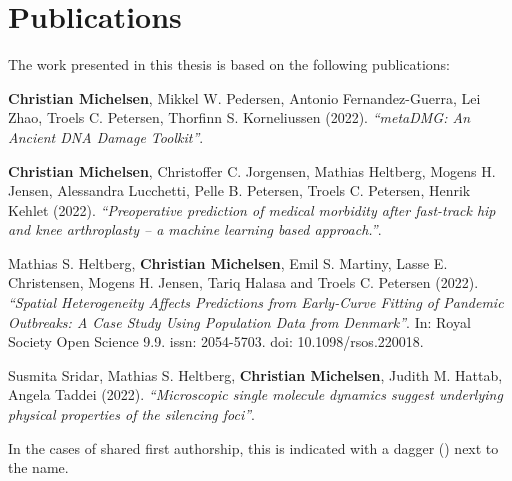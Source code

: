 \chapter{Publications}

The work presented in this thesis is based on the following publications:

\vspace{1.5cm}

\begin{description} [labelindent=1cm,style=multiline,leftmargin=3cm]
    \item [Paper 1:] \textbf{Christian Michelsen}\textsuperscript{\textdagger}, Mikkel W. Pedersen\textsuperscript{\textdagger}, Antonio Fernandez-Guerra, Lei Zhao, Troels C. Petersen, Thorfinn S. Korneliussen (2022). \emph{``metaDMG: An Ancient DNA Damage Toolkit''}. \\
    \item [Paper 2:] \textbf{Christian Michelsen}\textsuperscript{\textdagger}, Christoffer C. Jorgensen\textsuperscript{\textdagger}, Mathias Heltberg, Mogens H. Jensen, Alessandra Lucchetti, Pelle B. Petersen, Troels C. Petersen, Henrik Kehlet (2022). \emph{``Preoperative prediction of medical morbidity after fast-track hip and knee arthroplasty -- a machine learning based approach.''}. \\
    \item [Paper 3:] Mathias S. Heltberg\textsuperscript{\textdagger}, \textbf{Christian Michelsen}\textsuperscript{\textdagger}, Emil S. Martiny, Lasse E. Christensen, Mogens H. Jensen, Tariq Halasa and Troels C. Petersen (2022). \emph{``Spatial Heterogeneity Affects Predictions from Early-Curve Fitting of Pandemic Outbreaks: A Case Study Using Population Data from Denmark''}. In: Royal Society Open Science 9.9. issn: 2054-5703. doi: 10.1098/rsos.220018. \\
    \item [Paper 4:] Susmita Sridar, Mathias S. Heltberg, \textbf{Christian Michelsen}, Judith M. Hattab, Angela Taddei (2022). \emph{``Microscopic single molecule dynamics suggest underlying physical properties of the silencing foci''}.
\end{description}

\vspace{1cm}
\noindent In the cases of shared first authorship, this is indicated with a dagger (\textdagger) next to the name.

